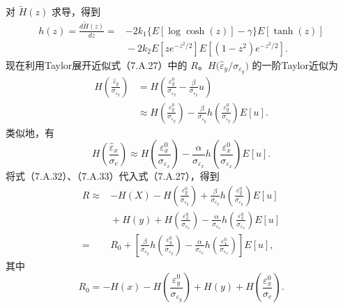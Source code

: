 对 $\widetilde H(z)$ 求导，得到
\begin{equation}
\begin{aligned}
h(z)=\frac{d\widetilde H(z)}{dz}
 ={}&-2k_1\{E[\log\cosh(z)]-\gamma\}E[\tanh(z)]\\
&{}-2k_2E\left[ze^{-z^2/2}\right]
 E\left[(1-z^2)e^{-z^2/2}\right].
\end{aligned}\tag{7.A.31}
\end{equation}
现在利用Taylor展开近似式（7.A.27）中的 $R$。$H\bigl(\widehat\varepsilon_y/\sigma_{\varepsilon_y}\bigr)$ 的一阶Taylor近似为
\begin{equation}
\begin{aligned}
H\left(\frac{\widehat\varepsilon_y}{\sigma_{\varepsilon_y}}\right)
 &=H\left(\frac{\varepsilon_y^0}{\sigma_{\varepsilon_y}}
 -\frac{\beta}{\sigma_{\varepsilon_y}}u\right)\\
 &\approx H\left(\frac{\varepsilon_y^0}{\sigma_{\varepsilon_y}}\right)
 -\frac{\beta}{\sigma_{\varepsilon_y}}
 h\left(\frac{\varepsilon_y^0}{\sigma_{\varepsilon_y}}\right)E[u].
\end{aligned}\tag{7.A.32}
\end{equation}
类似地，有
\begin{equation}
H\left(\frac{\widehat\varepsilon_x}{\sigma_e}\right)
 \approx H\left(\frac{\varepsilon_x^0}{\sigma_{\varepsilon_x}}\right)
 -\frac{\alpha}{\sigma_{\varepsilon_x}}
 h\left(\frac{\varepsilon_x^0}{\sigma_{\varepsilon_x}}\right)E[u].\tag{7.A.33}
\end{equation}
将式（7.A.32）、（7.A.33）代入式（7.A.27），得到
\begin{equation}
\begin{aligned}
R\approx{}&-H(X)-H\left(\frac{\varepsilon_y^0}{\sigma_{\varepsilon_y}}\right)
 +\frac{\beta}{\sigma_{\varepsilon_y}}
 h\left(\frac{\varepsilon_y^0}{\sigma_{\varepsilon_y}}\right)E[u]\\
&{}+H(y)+H\left(\frac{\varepsilon_x^0}{\sigma_{\varepsilon_x}}\right)
 -\frac{\alpha}{\sigma_{\varepsilon_x}}
 h\left(\frac{\varepsilon_x^0}{\sigma_{\varepsilon_x}}\right)E[u]\\
={}&R_0+\left[\frac{\beta}{\sigma_{\varepsilon_y}}
 h\left(\frac{\varepsilon_y^0}{\sigma_{\varepsilon_y}}\right)
 -\frac{\alpha}{\sigma_{\varepsilon_x}}
 h\left(\frac{\varepsilon_x^0}{\sigma_{\varepsilon_x}}\right)\right]E[u],
\end{aligned}\tag{7.A.34}
\end{equation}
其中
\begin{equation}
R_0=-H(x)-H\left(\frac{\varepsilon_y^0}{\sigma_{\varepsilon_y}}\right)
 +H(y)+H\left(\frac{\varepsilon_x^0}{\sigma_e}\right).\tag{7.A.35}
\end{equation}
